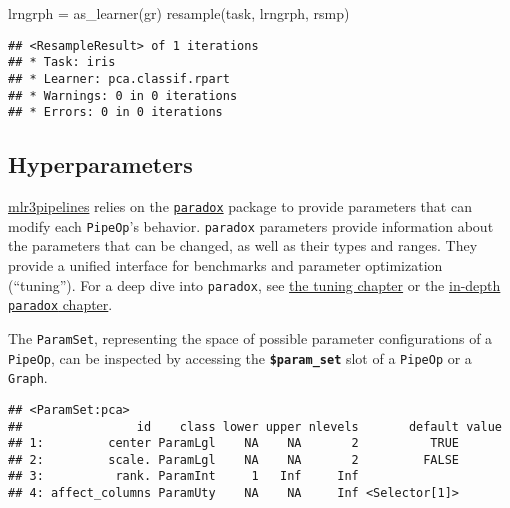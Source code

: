 \documentclass[
]{scrbook}
\newenvironment{Shaded}{\begin{snugshade}}{\end{snugshade}}
\newcommand{\FunctionTok}[1]{\textcolor[rgb]{0.00,0.00,0.00}{#1}}
\newcommand{\NormalTok}[1]{#1}
\newcommand{\OtherTok}[1]{\textcolor[rgb]{0.56,0.35,0.01}{#1}}
\newcommand{\SpecialCharTok}[1]{\textcolor[rgb]{0.00,0.00,0.00}{#1}}
\newcommand{\StringTok}[1]{\textcolor[rgb]{0.31,0.60,0.02}{#1}}
\renewenvironment{Shaded} {\begin{snugshade}\small} {\end{snugshade}}
\begin{document}
\begin{Shaded}
\begin{Highlighting}[]
\NormalTok{lrngrph }\OtherTok{=} \FunctionTok{as\_learner}\NormalTok{(gr)}
\FunctionTok{resample}\NormalTok{(task, lrngrph, rsmp)}
\end{Highlighting}
\end{Shaded}

\begin{verbatim}
## <ResampleResult> of 1 iterations
## * Task: iris
## * Learner: pca.classif.rpart
## * Warnings: 0 in 0 iterations
## * Errors: 0 in 0 iterations
\end{verbatim}

\hypertarget{hyperparameters}{%
\subsection{Hyperparameters}\label{hyperparameters}}

\href{https://cran.r-project.org/package=mlr3pipelines}{mlr3pipelines} relies on the \href{https://paradox.mlr-org.com}{\texttt{paradox}} package to provide parameters that can modify each \texttt{PipeOp}'s behavior.
\texttt{paradox} parameters provide information about the parameters that can be changed, as well as their types and ranges.
They provide a unified interface for benchmarks and parameter optimization (``tuning'').
For a deep dive into \texttt{paradox}, see \protect\hyperlink{searchspace}{the tuning chapter} or the \protect\hyperlink{paradox}{in-depth \texttt{paradox} chapter}.

The \texttt{ParamSet}, representing the space of possible parameter configurations of a \texttt{PipeOp}, can be inspected by accessing the \textbf{\texttt{\$param\_set}} slot of a \texttt{PipeOp} or a \texttt{Graph}.

\begin{Shaded}
\end{Shaded}

\begin{verbatim}
## <ParamSet:pca>
##                id    class lower upper nlevels       default value
## 1:         center ParamLgl    NA    NA       2          TRUE      
## 2:         scale. ParamLgl    NA    NA       2         FALSE      
## 3:          rank. ParamInt     1   Inf     Inf                    
## 4: affect_columns ParamUty    NA    NA     Inf <Selector[1]>
\end{verbatim}
\end{document}

